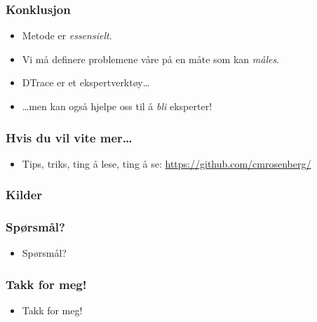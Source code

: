 \documentclass{beamer}
\begin{document}
 \begin{frame}
     \frametitle{Konklusjon}
     \begin{itemize}
         \item Metode er \emph{essensielt}.
         \item Vi må definere problemene våre på en måte som kan \emph{måles}.
         \item DTrace er et ekspertverktøy…
         \item …men kan også hjelpe oss til å \emph{bli} eksperter!
     \end{itemize}
 \end{frame}

 \begin{frame}
     \frametitle{Hvis du vil vite mer…}
     \begin{itemize}
         \item Tips, triks, ting å lese, ting å se: \url{https://github.com/cmrosenberg/}
     \end{itemize}
 \end{frame}

 \begin{frame}
     \frametitle{Kilder}
     \printbibliography
 \end{frame}

 \begin{frame}
     \frametitle{Spørsmål?}
     \begin{itemize}
         \item Spørsmål?
     \end{itemize}
 \end{frame}

 \begin{frame}
     \frametitle{Takk for meg!}
     \begin{itemize}
         \item Takk for meg!
     \end{itemize}
 \end{frame}
\end{document}

